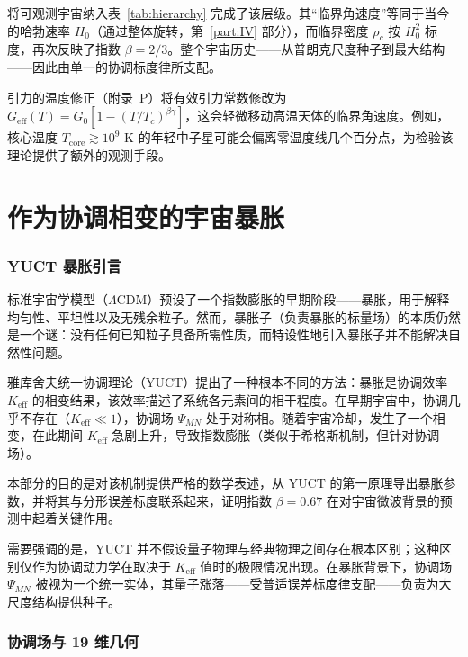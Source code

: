 \documentclass[11pt,a4paper]{article}
\newcommand{\Keff}{K_{\mathrm{eff}}}
\begin{document}
	将可观测宇宙纳入表~\ref{tab:hierarchy} 完成了该层级。其“临界角速度”等同于当今的哈勃速率 \(H_0\)（通过整体旋转，第~\ref{part:IV} 部分），而临界密度 \(\rho_c\) 按 \(H_0^2\) 标度，再次反映了指数 \(\beta=2/3\)。整个宇宙历史——从普朗克尺度种子到最大结构——因此由单一的协调标度律所支配。
	
	引力的温度修正（附录~P）将有效引力常数修改为 \(G_{\mathrm{eff}}(T) = G_0[1 - (T/T_c)^{\beta\gamma}]\)，这会轻微移动高温天体的临界角速度。例如，核心温度 \(T_{\mathrm{core}} \gtrsim 10^9\) K 的年轻中子星可能会偏离零温度线几个百分点，为检验该理论提供了额外的观测手段。
	
	\part{作为协调相变的宇宙暴胀}
	\label{part:III}
	
	\section{YUCT 暴胀引言}
	\label{sec:intro-inflation}
	
	标准宇宙学模型（\(\Lambda\)CDM）预设了一个指数膨胀的早期阶段——暴胀，用于解释均匀性、平坦性以及无残余粒子。然而，暴胀子（负责暴胀的标量场）的本质仍然是一个谜：没有任何已知粒子具备所需性质，而特设性地引入暴胀子并不能解决自然性问题。
	
	雅库舍夫统一协调理论（YUCT）提出了一种根本不同的方法：暴胀是协调效率 \(\Keff\) 的相变结果，该效率描述了系统各元素间的相干程度。在早期宇宙中，协调几乎不存在（\(\Keff \ll 1\)），协调场 \(\Psi_{MN}\) 处于对称相。随着宇宙冷却，发生了一个相变，在此期间 \(\Keff\) 急剧上升，导致指数膨胀（类似于希格斯机制，但针对协调场）。
	
	本部分的目的是对该机制提供严格的数学表述，从 YUCT 的第一原理导出暴胀参数，并将其与分形误差标度联系起来，证明指数 \(\beta = 0.67\) 在对宇宙微波背景的预测中起着关键作用。
	
	需要强调的是，YUCT 并不假设量子物理与经典物理之间存在根本区别；这种区别仅作为协调动力学在取决于 \(K_{\mathrm{eff}}\) 值时的极限情况出现。在暴胀背景下，协调场 \(\Psi_{MN}\) 被视为一个统一实体，其量子涨落——受普适误差标度律支配——负责为大尺度结构提供种子。
	
	\section{协调场与 19 维几何}
	\label{sec:field}
	
\end{document}
